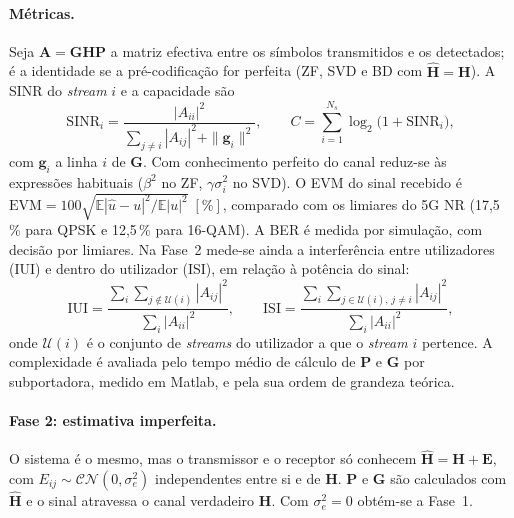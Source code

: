 \paragraph{Métricas.}
Seja $\mathbf{A}=\mathbf{G}\mathbf{H}\mathbf{P}$ a matriz efectiva entre os símbolos transmitidos e os detectados; é a identidade se a pré-codificação for perfeita (ZF, SVD e BD com $\hat{\mathbf{H}}=\mathbf{H}$). A SINR do \emph{stream} $i$ e a capacidade são
\begin{equation}
  \mathrm{SINR}_i=\frac{|A_{ii}|^2}{\sum_{j\neq i}|A_{ij}|^2+\|\mathbf{g}_i\|^2},\qquad C=\sum_{i=1}^{N_s}\log_2\!\big(1+\mathrm{SINR}_i\big),
  \label{eq:cap}
\end{equation}
com $\mathbf{g}_i$ a linha $i$ de $\mathbf{G}$. Com conhecimento perfeito do canal reduz-se às expressões habituais ($\beta^2$ no ZF, $\gamma\sigma_i^2$ no SVD). O EVM do sinal recebido é $\mathrm{EVM}=100\sqrt{\mathbb{E}|\hat{u}-u|^2/\mathbb{E}|u|^2}\;[\%]$, comparado com os limiares do 5G NR (17,5\,\% para QPSK e 12,5\,\% para 16-QAM). A BER é medida por simulação, com decisão por limiares. Na Fase~2 mede-se ainda a interferência entre utilizadores (IUI) e dentro do utilizador (ISI), em relação à potência do sinal:
\begin{equation}
  \mathrm{IUI}=\frac{\sum_i\sum_{j\notin\mathcal{U}(i)}|A_{ij}|^2}{\sum_i|A_{ii}|^2},\qquad
  \mathrm{ISI}=\frac{\sum_i\sum_{j\in\mathcal{U}(i),\,j\neq i}|A_{ij}|^2}{\sum_i|A_{ii}|^2},
\end{equation}
onde $\mathcal{U}(i)$ é o conjunto de \emph{streams} do utilizador a que o \emph{stream} $i$ pertence. A complexidade é avaliada pelo tempo médio de cálculo de $\mathbf{P}$ e $\mathbf{G}$ por subportadora, medido em Matlab, e pela sua ordem de grandeza teórica.

\paragraph{Fase 2: estimativa imperfeita.}
O sistema é o mesmo, mas o transmissor e o receptor só conhecem $\hat{\mathbf{H}}=\mathbf{H}+\mathbf{E}$, com $E_{ij}\sim\mathcal{CN}(0,\sigma_e^2)$ independentes entre si e de $\mathbf{H}$. $\mathbf{P}$ e $\mathbf{G}$ são calculados com $\hat{\mathbf{H}}$ e o sinal atravessa o canal verdadeiro $\mathbf{H}$. Com $\sigma_e^2=0$ obtém-se a Fase~1.

